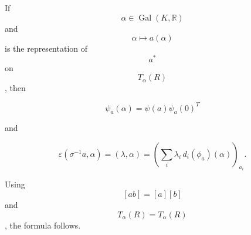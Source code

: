 If $$\alpha \in \operatorname{Gal}(K, \mathbb{R})$$ and $$\alpha \mapsto a(\alpha)$$ is the representation of $$a^*$$ on $$T_{\alpha}(R)$$, then

$$\psi_a(\alpha) = \psi(a) \psi_a(0)^T$$

and

$$\varepsilon(\sigma^{-1} a, \alpha) = (\lambda, \alpha) = \left( \sum_i \lambda_i \, d_i(\phi_a)(\alpha) \right)_{a_i}.$$

Using $$[ab] = [a][b]$$ and $$T_{\alpha}(R) = T_{\alpha}(R)$$, the formula follows.
